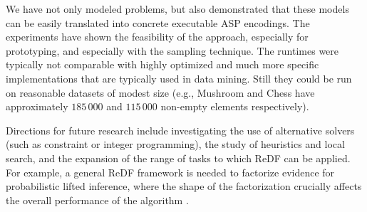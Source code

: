 

We have not only modeled problems, but also demonstrated that these models can be easily 
translated into concrete executable ASP encodings.
The experiments have shown the feasibility of the approach, especially for prototyping, and especially with the sampling technique.
The runtimes were typically not comparable with highly optimized and much more specific implementations that are typically used in data mining. 
Still they could be run on reasonable datasets of modest size (e.g.,  Mushroom and Chess have approximately $185\,000$ and $115\,000$ non-empty elements respectively). 

Directions for future research include investigating the use of alternative solvers (such as constraint or integer programming), the 
  study of heuristics and local search, and the expansion of the range of tasks to which ReDF can be applied. For example, a general ReDF framework is needed to factorize evidence for probabilistic lifted inference, where the shape of the factorization crucially affects the overall performance of the algorithm \parencite{DBLP:conf/nips/BroeckD13}.

